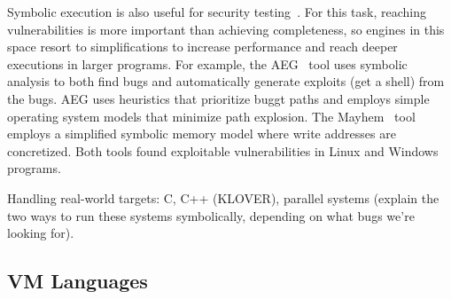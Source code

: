 


Symbolic execution is also useful for security testing~\cite{aeg,mayhem,bitBlaze}.  For this task, reaching vulnerabilities is more important than achieving completeness, so engines in this space resort to simplifications to increase performance and reach deeper executions in larger programs.
%
For example, the AEG~\cite{aeg} tool uses symbolic analysis to both find bugs and automatically generate exploits (get a shell) from the bugs.  AEG uses heuristics that prioritize buggt paths and employs simple operating system models that minimize path explosion.
%
The Mayhem~\cite{mayhem} tool employs a simplified symbolic memory model where write addresses are concretized.
%
Both tools found exploitable vulnerabilities in Linux and Windows programs.

Handling real-world targets: C, C++ (KLOVER), parallel systems (explain the two ways to run these systems symbolically, depending on what bugs we're looking for).

\subsection{VM Languages}



